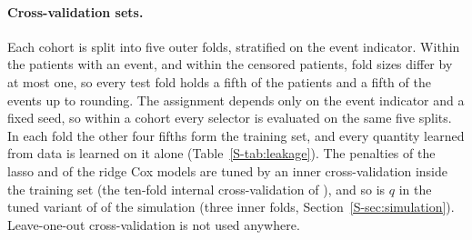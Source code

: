 \begin{table}[htbp]
\centering\footnotesize
\caption{Cohorts. $n$ is the number of patients analysed and $p$ the number of features
in the main benchmark. ``$p$ coding'' counts the protein-coding RNA features, the
feature set of the matched panel size analysis (Section~\ref{S-sec:cardinality}) and of
the gene-set enrichment (Section~\ref{S-sec:gsea}). Each TCGA cohort is assembled from
the OpenML datasets whose identifiers are listed as its data source, as in
\citet{herrmann2020} and \citet{bommert2021bib}.
METABRIC is the profile  of the cBioPortal study
, archived at \href{https://doi.org/\metabricdoi}{doi:\metabricdoi}.
n.r., not run.}
\label{S-tab:cohorts}

\end{table}

\paragraph{Cross-validation sets.} Each cohort is split into five outer folds, stratified
on the event indicator. Within the patients with an event, and within the censored
patients, fold sizes differ by at most one, so every test fold holds a fifth of the
patients and a fifth of the events up to rounding. The assignment depends only on the
event indicator and a fixed seed, so within a cohort every selector is evaluated on the
same five splits. In each fold the other four fifths form the training set, and every
quantity learned from data is learned on it alone (Table~\ref{S-tab:leakage}). The
penalties of the lasso and of the ridge Cox models are tuned by an inner cross-validation
inside the training set (the ten-fold internal cross-validation of ), and
so is $q$ in the tuned variant of  of the simulation (three inner folds,
Section~\ref{S-sec:simulation}). Leave-one-out cross-validation is not used anywhere.

